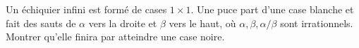 Un échiquier infini est formé de cases $1 \times 1$. Une puce part d'une case blanche et fait des sauts de $\alpha$ vers la droite et $\beta$ vers le haut, où $\alpha, \beta, \alpha/\beta$ sont irrationnels. Montrer qu'elle finira par atteindre une case noire.
